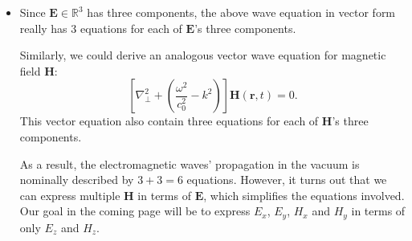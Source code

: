 \documentclass[11pt, a4paper]{article}
\renewcommand{\vec}[1]{\bm{#1}} %
\renewcommand{\r}{\vec{r}}
\newcommand{\E}{\vec{E}}  %
\renewcommand{\H}{\vec{H}}  %
\begin{document}
\begin{itemize}
	\item Since $ \E \in \mathbb{R}^{3} $ has three components, the above wave equation in vector form really has 3 equations for each of $ \E $'s three components. 
	
	Similarly, we could derive an analogous vector wave equation for magnetic field $ \H $:
	\begin{equation*}
		\left[\nabla_{\perp}^{2} + \left(\frac{\omega^{2}}{c_{0}^{2}} - k^{2}\right)\right]\H(\r, t) = 0.
	\end{equation*}
	This vector equation also contain three equations for each of $ \H $'s three components.
	
	As a result, the electromagnetic waves' propagation in the vacuum is nominally described by $ 3 + 3 = 6 $ equations. However, it turns out that we can express multiple $ \H $ in terms of $ \E $, which simplifies the equations involved. Our goal in the coming page will be to express $ E_{x} $, $ E_{y} $, $ H_{x} $ and $ H_{y} $ in terms of only $ E_{z} $ and $ H_{z} $.
	
\end{itemize}
\end{document}
